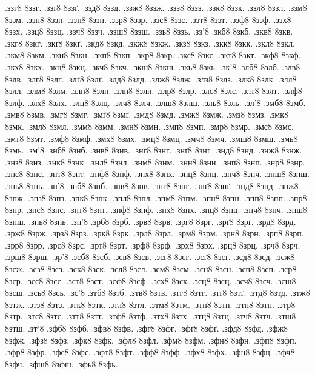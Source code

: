 {.ззг8
8ззг.
.ззґ8
8ззґ.
.ззд8
8ззд.
.ззж8
8ззж.
.ззз8
8ззз.
.ззк8
8ззк.
.ззл8
8ззл.
.ззм8
8ззм.
.ззн8
8ззн.
.ззп8
8ззп.
.ззр8
8ззр.
.ззс8
8ззс.
.ззт8
8ззт.
.ззф8
8ззф.
.ззх8
8ззх.
.ззц8
8ззц.
.ззч8
8ззч.
.ззш8
8ззш.
.ззь8
8ззь.
.зз'8
.зкб8
8зкб.
.зкв8
8зкв.
.зкг8
8зкг.
.зкґ8
8зкґ.
.зкд8
8зкд.
.зкж8
8зкж.
.зкз8
8зкз.
.зкк8
8зкк.
.зкл8
8зкл.
.зкм8
8зкм.
.зкн8
8зкн.
.зкп8
8зкп.
.зкр8
8зкр.
.зкс8
8зкс.
.зкт8
8зкт.
.зкф8
8зкф.
.зкх8
8зкх.
.зкц8
8зкц.
.зкч8
8зкч.
.зкш8
8зкш.
.зкь8
8зкь.
.зк'8
.злб8
8злб.
.злв8
8злв.
.злг8
8злг.
.злґ8
8злґ.
.злд8
8злд.
.злж8
8злж.
.злз8
8злз.
.злк8
8злк.
.злл8
8злл.
.злм8
8злм.
.злн8
8злн.
.злп8
8злп.
.злр8
8злр.
.злс8
8злс.
.злт8
8злт.
.злф8
8злф.
.злх8
8злх.
.злц8
8злц.
.злч8
8злч.
.злш8
8злш.
.зль8
8зль.
.зл'8
.змб8
8змб.
.змв8
8змв.
.змг8
8змг.
.змґ8
8змґ.
.змд8
8змд.
.змж8
8змж.
.змз8
8змз.
.змк8
8змк.
.змл8
8змл.
.змм8
8змм.
.змн8
8змн.
.змп8
8змп.
.змр8
8змр.
.змс8
8змс.
.змт8
8змт.
.змф8
8змф.
.змх8
8змх.
.змц8
8змц.
.змч8
8змч.
.змш8
8змш.
.змь8
8змь.
.зм'8
.знб8
8знб.
.знв8
8знв.
.знг8
8знг.
.знґ8
8знґ.
.знд8
8знд.
.знж8
8знж.
.знз8
8знз.
.знк8
8знк.
.знл8
8знл.
.знм8
8знм.
.знн8
8знн.
.знп8
8знп.
.знр8
8знр.
.знс8
8знс.
.знт8
8знт.
.знф8
8знф.
.знх8
8знх.
.знц8
8знц.
.знч8
8знч.
.знш8
8знш.
.знь8
8знь.
.зн'8
.зпб8
8зпб.
.зпв8
8зпв.
.зпг8
8зпг.
.зпґ8
8зпґ.
.зпд8
8зпд.
.зпж8
8зпж.
.зпз8
8зпз.
.зпк8
8зпк.
.зпл8
8зпл.
.зпм8
8зпм.
.зпн8
8зпн.
.зпп8
8зпп.
.зпр8
8зпр.
.зпс8
8зпс.
.зпт8
8зпт.
.зпф8
8зпф.
.зпх8
8зпх.
.зпц8
8зпц.
.зпч8
8зпч.
.зпш8
8зпш.
.зпь8
8зпь.
.зп'8
.зрб8
8зрб.
.зрв8
8зрв.
.зрг8
8зрг.
.зрґ8
8зрґ.
.зрд8
8зрд.
.зрж8
8зрж.
.зрз8
8зрз.
.зрк8
8зрк.
.зрл8
8зрл.
.зрм8
8зрм.
.зрн8
8зрн.
.зрп8
8зрп.
.зрр8
8зрр.
.зрс8
8зрс.
.зрт8
8зрт.
.зрф8
8зрф.
.зрх8
8зрх.
.зрц8
8зрц.
.зрч8
8зрч.
.зрш8
8зрш.
.зр'8
.зсб8
8зсб.
.зсв8
8зсв.
.зсг8
8зсг.
.зсґ8
8зсґ.
.зсд8
8зсд.
.зсж8
8зсж.
.зсз8
8зсз.
.зск8
8зск.
.зсл8
8зсл.
.зсм8
8зсм.
.зсн8
8зсн.
.зсп8
8зсп.
.зср8
8зср.
.зсс8
8зсс.
.зст8
8зст.
.зсф8
8зсф.
.зсх8
8зсх.
.зсц8
8зсц.
.зсч8
8зсч.
.зсш8
8зсш.
.зсь8
8зсь.
.зс'8
.зтб8
8зтб.
.зтв8
8зтв.
.зтг8
8зтг.
.зтґ8
8зтґ.
.зтд8
8зтд.
.зтж8
8зтж.
.зтз8
8зтз.
.зтк8
8зтк.
.зтл8
8зтл.
.зтм8
8зтм.
.зтн8
8зтн.
.зтп8
8зтп.
.зтр8
8зтр.
.зтс8
8зтс.
.зтт8
8зтт.
.зтф8
8зтф.
.зтх8
8зтх.
.зтц8
8зтц.
.зтч8
8зтч.
.зтш8
8зтш.
.зт'8
.зфб8
8зфб.
.зфв8
8зфв.
.зфг8
8зфг.
.зфґ8
8зфґ.
.зфд8
8зфд.
.зфж8
8зфж.
.зфз8
8зфз.
.зфк8
8зфк.
.зфл8
8зфл.
.зфм8
8зфм.
.зфн8
8зфн.
.зфп8
8зфп.
.зфр8
8зфр.
.зфс8
8зфс.
.зфт8
8зфт.
.зфф8
8зфф.
.зфх8
8зфх.
.зфц8
8зфц.
.зфч8
8зфч.
.зфш8
8зфш.
.зфь8
8зфь.
}
